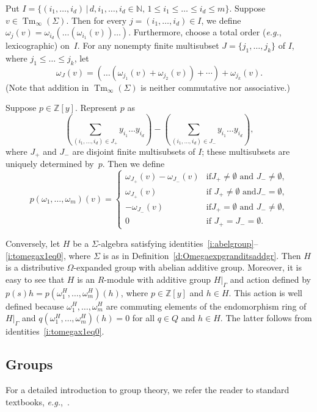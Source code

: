 \documentclass{jgcc}
\DeclareMathOperator{\Tm}{Tm}
\newcommand{\cs}{,\,}
\newcommand{\st}{\,|\,}
\newcommand{\Add}[1]{#1|_\Gamma}
\newcommand{\N}{\mathbb N}
\newcommand{\Z}{\mathbb Z}
\newcommand{\eg}{\emph{e.g.}}
\begin{document}
\begin{rem}
Put $I=\{(i_1,\dots,i_d)\st d,i_1,\dots,i_d\in\N\cs1\le
i_1\le\dots\le i_d\le m\}$. Suppose
$v\in\Tm_\infty(\Sigma)$. Then for every
$j=(i_1,\dots,i_d)\in I$, we define
$\omega_j(v)=\omega_{i_d}(\dots(\omega_{i_1}(v))\dots)$.
Furthermore, choose a total order (\eg, lexicographic)
on~$I$. For any nonempty finite multisubset
$J=\{j_1,\dots,j_k\}$ of $I$, where $j_1\le\dots\le j_k$,
let
\[
\omega_J(v)=(\dots(\omega_{j_1}(v)+\omega_{j_2}(v))+\dotsb)
+\omega_{j_k}(v).
\]
(Note that addition in $\Tm_\infty(\Sigma)$ is neither
commutative nor associative.)

Suppose $p\in\Z[y]$. Represent $p$ as
\[
\left(\sum_{(i_1,\dots,i_d)\in J_+}y_{i_1}\dots
y_{i_d}\right)-\left(\sum_{(i_1,\dots,i_d)\in
J_-}y_{i_1}\dots y_{i_d}\right),
\]
where $J_+$ and $J_-$ are disjoint finite multisubsets of
$I$; these multisubsets are uniquely determined by~$p$. Then
we define
\[
p(\omega_1,\dots,\omega_m)(v)=\begin{cases}
\omega_{J_+}(v)-\omega_{J_-}(v)&\text{if
}J_+\ne\emptyset\text{ and }J_-\ne\emptyset,\\
\omega_{J_+}(v)&\text{if }J_+\ne\emptyset\text{ and
}J_-=\emptyset,\\-\omega_{J_-}(v)&\text{if
}J_+=\emptyset\text{ and }J_-\ne\emptyset,\\
0&\text{if }J_+=J_-=\emptyset.
\end{cases}
\]

Conversely, let $H$ be a $\Sigma$-algebra satisfying
identities~\ref{i:abelgroup}--\ref{i:tomegax1eq0}, where
$\Sigma$ is as in Definition~\ref{d:Omegaexpgranditsaddgr}.
Then $H$ is a distributive $\Omega$-expanded group with
abelian additive group. Moreover, it is easy to see that $H$
is an $R$-module with additive group $\Add H$ and action
defined by $p(s)h=p(\omega_1^H,\dots,\omega_m^H)(h)$, where
$p\in\Z[y]$ and $h\in H$. This action is well defined
because $\omega_1^H,\dots,\omega_m^H$ are commuting elements
of the endomorphism ring of $\Add H$ and
$q(\omega_1^H,\dots,\omega_m^H)(h)=0$ for all $q\in Q$ and
$h\in H$. The latter follows from
identities~\ref{i:tomegax1eq0}.
\end{rem}

\subsection{Groups}
\label{ss:groups}

For a detailed introduction to group theory, we refer the
reader to standard textbooks, \eg,~\cite{Rob96, Rot95}.
\end{document}
